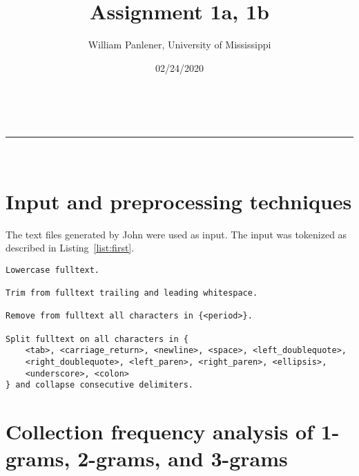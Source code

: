 \documentclass[a4paper,11pt]{article}
\makeatletter
\newcommand{\linia}{\rule{\linewidth}{0.5pt}}
\theoremstyle{mytheor}
\renewcommand{\maketitle}{
\begin{center}
\vspace{2ex}
{\huge \textsc{\@title}}
\vspace{1ex}
\\
\linia\\
\@author \hfill \@date
\vspace{4ex}
\end{center}
}
\makeatother
\begin{document}
\title{Assignment \textnumero{} 1a, 1b}

\author{William Panlener, University of Mississippi}

\date{02/24/2020}

\maketitle

\section*{Input and preprocessing techniques}

The text files generated by John were used as input. The input was tokenized as described in Listing~\ref{list:first}.

\begin{lstlisting}[label={list:first},caption=Tokenizer]
Lowercase fulltext.

Trim from fulltext trailing and leading whitespace.

Remove from fulltext all characters in {<period>}.

Split fulltext on all characters in {
	<tab>, <carriage_return>, <newline>, <space>, <left_doublequote>,
	<right_doublequote>, <left_paren>, <right_paren>, <ellipsis>,
	<underscore>, <colon>
} and collapse consecutive delimiters.

\end{lstlisting}

\section*{Collection frequency analysis of 1-grams, 2-grams, and 3-grams}
\end{document}
